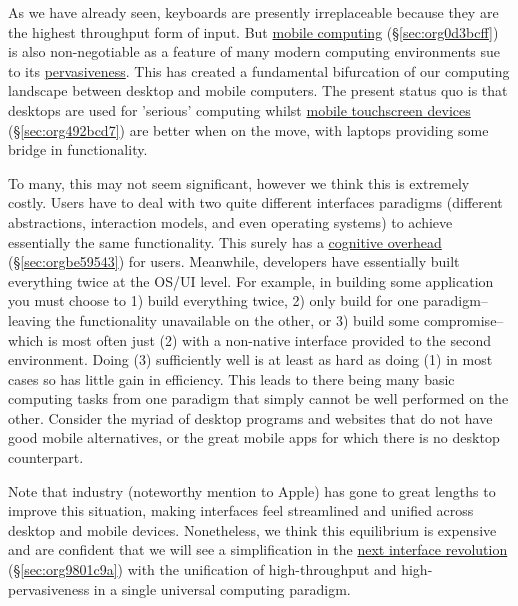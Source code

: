 \documentclass[logo,bsc,singlespacing,parskip]{infthesis}
\begin{document}
As we have already seen, keyboards are presently irreplaceable because they are the highest throughput form of input.
But \hyperref[sec:org0d3bcff]{mobile computing} (\S \ref{sec:org0d3bcff}) is also non-negotiable as a feature of many modern computing environments sue to its \hyperref[pervasiveness]{pervasiveness}.
This has created a fundamental bifurcation of our computing landscape between desktop and mobile computers.
The present status quo is that desktops are used for 'serious' computing whilst \hyperref[sec:org492bcd7]{mobile touchscreen devices} (\S \ref{sec:org492bcd7}) are better when on the move, with laptops providing some bridge in functionality.

To many, this may not seem significant, however we think this is extremely costly.
Users have to deal with two quite different interfaces paradigms (different abstractions, interaction models, and even operating systems) to achieve essentially the same functionality.
This surely has a \hyperref[sec:orgbe59543]{cognitive overhead} (\S \ref{sec:orgbe59543}) for users.
Meanwhile, developers have essentially built everything twice at the OS/UI level.
For example, in building some application you must choose to 1) build everything twice, 2) only build for one paradigm-- leaving the functionality unavailable on the other, or 3) build some compromise-- which is most often just (2) with a non-native interface provided to the second environment.
Doing (3) sufficiently well is at least as hard as doing (1) in most cases so has little gain in efficiency.
This leads to there being many basic computing tasks from one paradigm that simply cannot be well performed on the other.
Consider the myriad of desktop programs and websites that do not have good mobile alternatives, or the great mobile apps for which there is no desktop counterpart.

Note that industry (noteworthy mention to Apple) has gone to great lengths to improve this situation, making interfaces feel streamlined and unified across desktop and mobile devices.
Nonetheless, we think this equilibrium is expensive and are confident that we will see a simplification in the \hyperref[sec:org9801c9a]{next interface revolution} (\S \ref{sec:org9801c9a}) with the unification of high-throughput and high-pervasiveness in a single universal computing paradigm.
\end{document}
